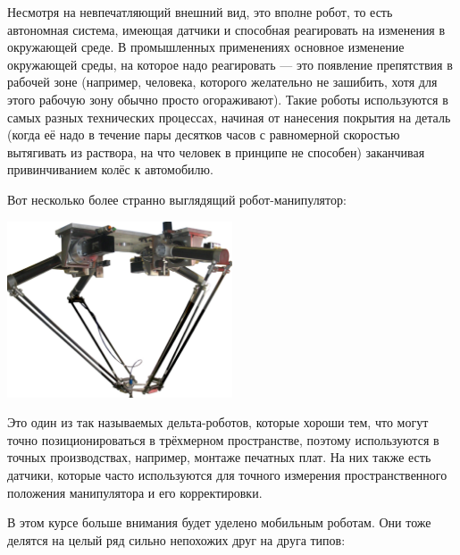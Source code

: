 \documentclass{../../text-style}
\begin{document}
Несмотря на невпечатляющий внешний вид, это вполне робот, то есть автономная система, имеющая датчики и способная реагировать на изменения в окружающей среде.
В промышленных применениях основное изменение окружающей среды, на которое надо реагировать --- это появление препятствия в рабочей зоне (например, человека, которого желательно не зашибить, хотя для этого рабочую зону обычно просто огораживают).
Такие роботы используются в самых разных технических процессах, начиная от нанесения покрытия на деталь (когда её надо в течение пары десятков часов с равномерной скоростью вытягивать из раствора, на что человек в принципе не способен) заканчивая привинчиванием колёс к автомобилю.

Вот несколько более странно выглядящий робот-манипулятор:

\begin{center}
    \includegraphics[width=0.5\textwidth]{delta.png}
\end{center}

Это один из так называемых дельта-роботов, которые хороши тем, что могут точно позиционироваться в трёхмерном пространстве, поэтому используются в точных производствах, например, монтаже печатных плат.
На них также есть датчики, которые часто используются для точного измерения пространственного положения манипулятора и его корректировки.

В этом курсе больше внимания будет уделено мобильным роботам.
Они тоже делятся на целый ряд сильно непохожих друг на друга типов:
\end{document}
